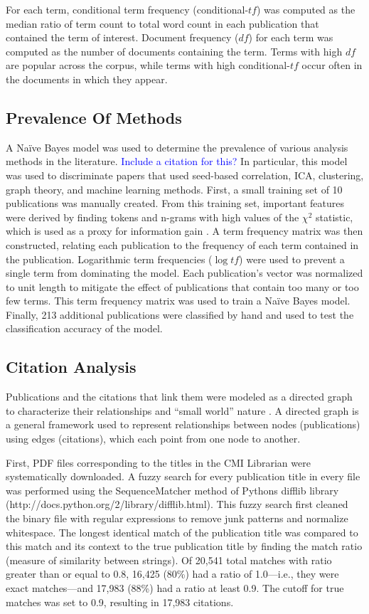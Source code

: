 \documentclass[12pt,3p,review,number]{elsarticle}
\begin{document}
For each term, conditional term frequency (conditional-$t\!f$) was computed as the
median ratio of term count to total word count in each publication that
contained the term of interest. Document frequency ($d\!f$) for each term was
computed as the number of documents containing the term. Terms with high $d\!f$ are
popular across the corpus, while terms with high conditional-$t\!f$ occur often in
the documents in which they appear.  

\subsection{Prevalence Of Methods} 
A Na\"ive Bayes model was used to determine the prevalence of various analysis
methods in the literature. \textcolor{blue}{Include a citation for this?} In particular, this model was used to discriminate
papers that used seed-based correlation, ICA, clustering, graph theory, and machine
learning methods. First, a small training set of 10 publications was manually
created.  From this training set, important features were derived by finding
tokens and n-grams with high values of the $\chi^2$ statistic, which is used as
a proxy for information gain \cite{Quinlan86}. A term
frequency matrix was then constructed, relating each publication to the
frequency of each term contained in the publication. Logarithmic term
frequencies ($\log{t\!f}$) were used to prevent a single term from dominating
the model.  Each publication’s vector was normalized to unit length to mitigate
the effect of publications that contain too many or too few terms. This term
frequency matrix was used to train a Na\"ive Bayes model. Finally, 213
additional publications were classified by hand and used to test the
classification accuracy of the model.

\subsection{Citation Analysis}
Publications and the citations that link them were modeled as a directed graph
to characterize their relationships and ``small world'' nature \cite{Watts1998}.
A directed graph is a general framework used to represent relationships between
nodes (publications) using edges (citations), which each point from one node to
another.

First, PDF files corresponding to the titles in the CMI Librarian were
systematically downloaded. A fuzzy search for every publication title in every
file was performed using the SequenceMatcher method of Pythons difflib library
(http://docs.python.org/2/library/difflib.html). This fuzzy search first cleaned
the binary file with regular expressions to remove junk patterns and normalize
whitespace. The longest identical match of the publication title was compared
to this match and its context to the true publication title by finding the match
ratio (measure of similarity between strings). Of 20,541 total matches with
ratio greater than or equal to 0.8, 16,425 (80\%) had a ratio of 1.0—i.e., they
were exact matches—and 17,983 (88\%) had a ratio at least 0.9. The cutoff for
true matches was set to 0.9, resulting in 17,983 citations. 
\end{document}
